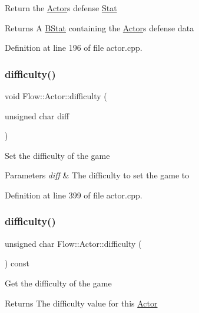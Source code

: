 Return the \hyperlink{class_flow_1_1_actor}{Actor}\textquotesingle{}s defense \hyperlink{class_flow_1_1_stat}{Stat} \begin{DoxyReturn}{Returns}
A \hyperlink{class_flow_1_1_b_stat}{B\+Stat} containing the \hyperlink{class_flow_1_1_actor}{Actor}\textquotesingle{}s defense data 
\end{DoxyReturn}


Definition at line 196 of file actor.\+cpp.

\hypertarget{class_flow_1_1_actor_aec7a9e3499e6d4441d3f32c4437b3d83}{}\label{class_flow_1_1_actor_aec7a9e3499e6d4441d3f32c4437b3d83} 
\subsubsection{\texorpdfstring{difficulty()}{difficulty()}\hspace{0.1cm}{\footnotesize\ttfamily [1/2]}}
{\footnotesize\ttfamily void Flow\+::\+Actor\+::difficulty (\begin{DoxyParamCaption}\item[{unsigned char}]{diff }\end{DoxyParamCaption})}

Set the difficulty of the game 
\begin{DoxyParams}{Parameters}
{\em diff} & The difficulty to set the game to \\
\hline
\end{DoxyParams}


Definition at line 399 of file actor.\+cpp.

\hypertarget{class_flow_1_1_actor_a2e4ed70c823b510309914f53e26495da}{}\label{class_flow_1_1_actor_a2e4ed70c823b510309914f53e26495da} 
\subsubsection{\texorpdfstring{difficulty()}{difficulty()}\hspace{0.1cm}{\footnotesize\ttfamily [2/2]}}
{\footnotesize\ttfamily unsigned char Flow\+::\+Actor\+::difficulty (\begin{DoxyParamCaption}{ }\end{DoxyParamCaption}) const}

Get the difficulty of the game \begin{DoxyReturn}{Returns}
The difficulty value for this \hyperlink{class_flow_1_1_actor}{Actor} 
\end{DoxyReturn}


